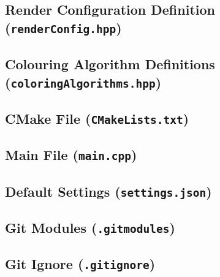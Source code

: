 \pagebreak

\subsection{Render Configuration Definition (\texttt{renderConfig.hpp})}



% 

\pagebreak

\subsection{Colouring Algorithm Definitions (\texttt{coloringAlgorithms.hpp})}



% 

\pagebreak

\subsection{CMake File (\texttt{CMakeLists.txt})}


\pagebreak

\subsection{Main File (\texttt{main.cpp})}


\pagebreak

\subsection{Default Settings (\texttt{settings.json})}


\pagebreak

\subsection{Git Modules (\texttt{.gitmodules})}


\pagebreak

\subsection{Git Ignore (\texttt{.gitignore})}


